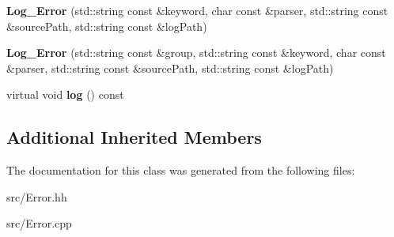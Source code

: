 \begin{DoxyCompactItemize}
\item 
\hypertarget{classstb_1_1Log__Error_afbfcc06e2cf3776cc34795bedecd38cd}{{\bfseries Log\+\_\+\+Error} (std\+::string const \&keyword, char const \&parser, std\+::string const \&source\+Path, std\+::string const \&log\+Path)}\label{classstb_1_1Log__Error_afbfcc06e2cf3776cc34795bedecd38cd}

\item 
\hypertarget{classstb_1_1Log__Error_a64a6bc44e88d30b1ef041ef71c3385dc}{{\bfseries Log\+\_\+\+Error} (std\+::string const \&group, std\+::string const \&keyword, char const \&parser, std\+::string const \&source\+Path, std\+::string const \&log\+Path)}\label{classstb_1_1Log__Error_a64a6bc44e88d30b1ef041ef71c3385dc}

\item 
\hypertarget{classstb_1_1Log__Error_a4a226f13ceb32685ca3f197b4cabe223}{virtual void {\bfseries log} () const }\label{classstb_1_1Log__Error_a4a226f13ceb32685ca3f197b4cabe223}

\end{DoxyCompactItemize}
\subsection*{Additional Inherited Members}


The documentation for this class was generated from the following files\+:\begin{DoxyCompactItemize}
\item 
src/Error.\+hh\item 
src/Error.\+cpp\end{DoxyCompactItemize}
